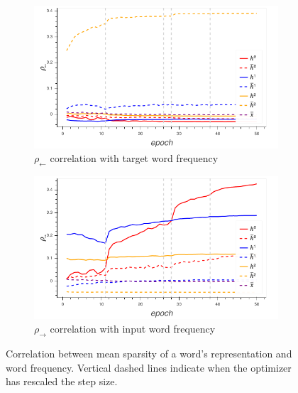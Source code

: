 \begin{figure}
\begin{subfigure}{0.48\textwidth}
\includegraphics[width=\textwidth]{sparsity/target_concentration}
\caption{$\rho_{\leftarrow}$ correlation with target word frequency} \label{fig:target_concentration}
\end{subfigure}
\begin{subfigure}{0.48\textwidth}
\includegraphics[width=\textwidth]{sparsity/source_concentration}
\caption{$\rho_{\rightarrow}$ correlation with input word frequency} \label{fig:source_concentration}
\end{subfigure}
\caption{Correlation between mean sparsity of a word's representation and word frequency. Vertical dashed lines indicate when the optimizer has rescaled the step size.} 
\label{fig:concentration}
\end{figure}
 



